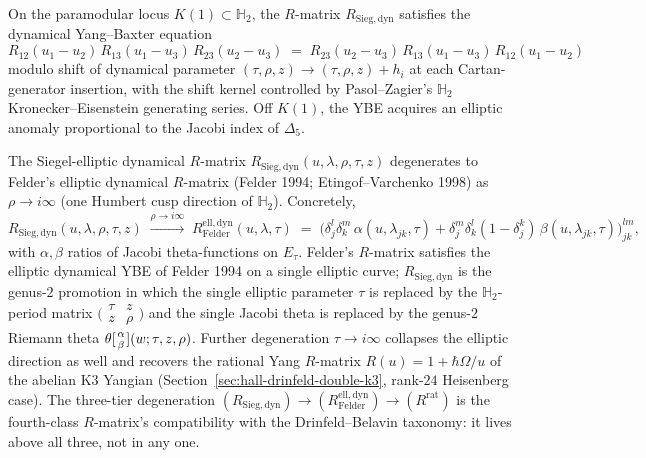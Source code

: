 \begin{theorem}
\label{thm:R-Sieg-YBE}
On the paramodular locus $K(1)\subset \mathbb{H}_2$, the $R$-matrix $R_{\mathrm{Sieg,dyn}}$
satisfies the dynamical Yang--Baxter equation
\[
 R_{12}(u_1-u_2)\, R_{13}(u_1-u_3)\, R_{23}(u_2-u_3)
 \;=\;
 R_{23}(u_2-u_3)\, R_{13}(u_1-u_3)\, R_{12}(u_1-u_2)
\]
modulo shift of dynamical parameter $(\tau,\rho,z)\to(\tau,\rho,z)+h_i$ at each
Cartan-generator insertion, with the shift kernel controlled by Pasol--Zagier's
$\mathbb{H}_2$ Kronecker--Eisenstein generating series. Off $K(1)$, the YBE acquires
an elliptic anomaly proportional to the Jacobi index of $\Delta_5$.
\end{theorem}

\begin{remark}
\label{rem:R-Sieg-felder-genus1}
The Siegel-elliptic dynamical $R$-matrix $R_{\mathrm{Sieg,dyn}}(u,\lambda,\rho,\tau,z)$
degenerates to Felder's elliptic dynamical $R$-matrix (Felder 1994;
Etingof--Varchenko 1998) as $\rho\to i\infty$ (one Humbert cusp direction of
$\mathbb{H}_2$). Concretely,
\[
 R_{\mathrm{Sieg,dyn}}(u,\lambda,\rho,\tau,z)
 \;\xrightarrow{\rho\to i\infty}\;
 R^{\mathrm{ell,dyn}}_{\mathrm{Felder}}(u,\lambda,\tau)
 \;=\;
 \bigl(\delta^l_j\delta^m_k\,\alpha(u,\lambda_{jk},\tau)
 + \delta^m_j\delta^l_k(1-\delta^k_j)\,\beta(u,\lambda_{jk},\tau)\bigr)_{jk}^{lm},
\]
with $\alpha,\beta$ ratios of Jacobi theta-functions on $E_\tau$. Felder's $R$-matrix
satisfies the elliptic dynamical YBE of Felder 1994 on a single elliptic curve;
$R_{\mathrm{Sieg,dyn}}$ is the genus-$2$ promotion in which the single elliptic
parameter $\tau$ is replaced by the $\mathbb{H}_2$-period matrix
$\bigl(\begin{smallmatrix}\tau & z\\ z & \rho\end{smallmatrix}\bigr)$ and the single
Jacobi theta is replaced by the genus-$2$ Riemann theta
$\theta[{\alpha\atop\beta}](w;\tau,z,\rho)$. Further degeneration $\tau\to i\infty$
collapses the elliptic direction as well and recovers the rational Yang $R$-matrix
$R(u) = 1 + \hbar\Omega/u$ of the abelian K3 Yangian
(Section~\ref{sec:hall-drinfeld-double-k3}, rank-$24$ Heisenberg case). The three-tier
degeneration $(R_{\mathrm{Sieg,dyn}}) \to (R^{\mathrm{ell,dyn}}_{\mathrm{Felder}})
\to (R^{\mathrm{rat}})$ is the fourth-class $R$-matrix's compatibility with the
Drinfeld--Belavin taxonomy: it lives above all three, not in any one.
\end{remark}

